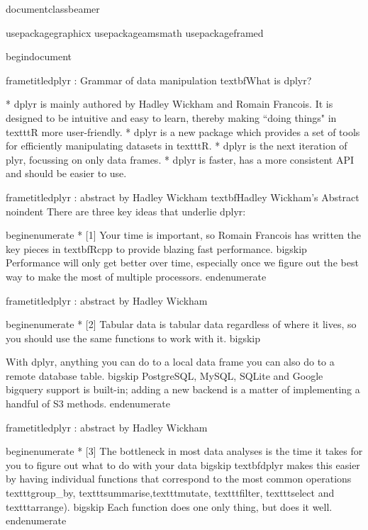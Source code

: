 documentclass{beamer}

usepackage{graphicx}
usepackage{amsmath}
usepackage{framed}

begin{document}
	
	
	
		frametitle{dplyr : Grammar of data manipulation}
		textbf{What is dplyr?}
		
			         * dplyr is mainly authored by Hadley Wickham and Romain Francois. It is designed to be intuitive and easy to learn, thereby making ``doing things" in texttt{R} more user-friendly.
			         * dplyr is a new package which provides a set of tools for efficiently manipulating datasets in texttt{R}.
			         * dplyr is the next iteration of plyr, focussing on only data frames.          * dplyr is faster, has a more consistent API and should be easier to use. 
		
	
	
	
		frametitle{dplyr : abstract by Hadley Wickham}	
		textbf{Hadley Wickham's Abstract}
		noindent There are three key ideas that underlie dplyr:
		
		begin{enumerate}
			        * [1] Your time is important, so Romain Francois has written the key pieces in textbf{Rcpp} to provide blazing fast performance.  bigskip Performance will only get better over time, especially once we figure out the best way to make the most of multiple processors. 
		end{enumerate}
	
	
		frametitle{dplyr : abstract by Hadley Wickham}	
		
		begin{enumerate}
			        * [2] Tabular data is tabular data regardless of where it lives, so you should use the same functions to work with it.  bigskip
			
			With dplyr, anything you can do to a local data frame you can also do to a remote database table.  bigskip PostgreSQL, MySQL, SQLite and Google bigquery support is built-in; adding a new backend is a matter of implementing a handful of S3 methods. 
		end{enumerate}
	
	
		frametitle{dplyr : abstract by Hadley Wickham}	
		
		begin{enumerate}
			        * [3] The bottleneck in most data analyses is the time it takes for you to figure out what to do with your data
			 bigskip textbf{dplyr} makes this easier by having individual functions that correspond to the most common operations  texttt{group_by}, texttt{summarise},texttt{mutate}, texttt{filter}, texttt{select} and texttt{arrange}). 	 bigskip Each function does one only thing, but does it well.
		end{enumerate}
	
